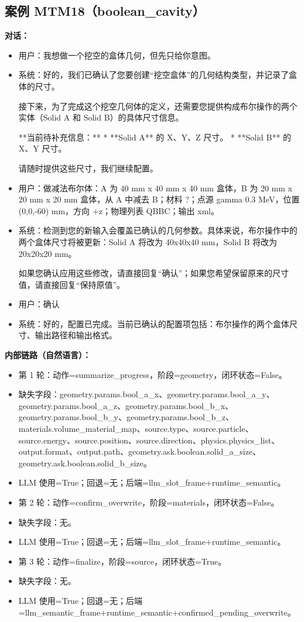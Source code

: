 \documentclass[11pt]{ctexart}
\begin{document}
\subsection{案例 MTM18（boolean\_cavity）}
\textbf{对话：}
\begin{itemize}
\item 用户：我想做一个挖空的盒体几何，但先只给你意图。
\item 系统：好的，我们已确认了您要创建“挖空盒体”的几何结构类型，并记录了盒体的尺寸。

接下来，为了完成这个挖空几何体的定义，还需要您提供构成布尔操作的两个实体（Solid A 和 Solid B）的具体尺寸信息。

**当前待补充信息：**
*   **Solid A** 的 X、Y、Z 尺寸。
*   **Solid B** 的 X、Y 尺寸。

请随时提供这些尺寸，我们继续配置。
\item 用户：做减法布尔体：A 为 40 mm x 40 mm x 40 mm 盒体，B 为 20 mm x 20 mm x 20 mm 盒体，从 A 中减去 B；材料 ?；点源 gamma 0.3 MeV，位置 (0,0,-60) mm，方向 +z；物理列表 QBBC；输出 xml。
\item 系统：检测到您的新输入会覆盖已确认的几何参数。具体来说，布尔操作中的两个盒体尺寸将被更新：Solid A 将改为 40x40x40 mm，Solid B 将改为 20x20x20 mm。

如果您确认应用这些修改，请直接回复“确认”；如果您希望保留原来的尺寸值，请直接回复“保持原值”。
\item 用户：确认
\item 系统：好的，配置已完成。当前已确认的配置项包括：布尔操作的两个盒体尺寸、输出路径和输出格式。
\end{itemize}
\textbf{内部链路（自然语言）：}
\begin{itemize}
\item 第 1 轮：动作=summarize\_progress，阶段=geometry，闭环状态=False。
\item 缺失字段：geometry.params.bool\_a\_x、geometry.params.bool\_a\_y、geometry.params.bool\_a\_z、geometry.params.bool\_b\_x、geometry.params.bool\_b\_y、geometry.params.bool\_b\_z、materials.volume\_material\_map、source.type、source.particle、source.energy、source.position、source.direction、physics.physics\_list、output.format、output.path、geometry.ask.boolean.solid\_a\_size、geometry.ask.boolean.solid\_b\_size。
\item LLM 使用=True；回退=无；后端=llm\_slot\_frame+runtime\_semantic。
\item 第 2 轮：动作=confirm\_overwrite，阶段=materials，闭环状态=False。
\item 缺失字段：无。
\item LLM 使用=True；回退=无；后端=llm\_slot\_frame+runtime\_semantic。
\item 第 3 轮：动作=finalize，阶段=source，闭环状态=True。
\item 缺失字段：无。
\item LLM 使用=True；回退=无；后端=llm\_semantic\_frame+runtime\_semantic+confirmed\_pending\_overwrite。
\end{itemize}
\end{document}
